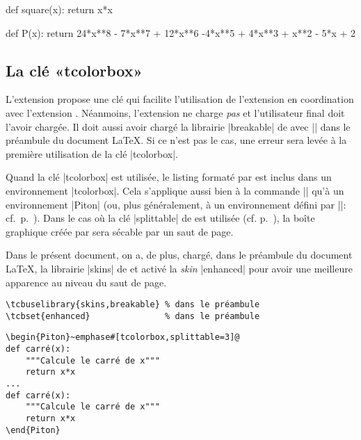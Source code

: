 \documentclass[dvipsnames,svgnames]{article}
\begin{document}
\begin{center}
\begin{Piton}
def square(x):
    return x*x
\end{Piton}
\hspace{1cm}
\begin{Piton}
def P(x):
    return 24*x**8 - 7*x**7 + 12*x**6 -4*x**5 + 4*x**3 + x**2 - 5*x + 2
\end{Piton}
\end{center}


\subsection{La clé «tcolorbox»}

\label{tcolorbox}

L'extension  propose une clé  qui facilite
l'utilisation de l'extension  en coordination avec l'extension
. Néanmoins, l'extension  ne charge \emph{pas} 
et l'utilisateur final doit l'avoir chargée. Il doit aussi avoir chargé la
librairie |breakable| de  avec || dans le
préambule du document LaTeX. Si ce n'est pas le cas, une erreur sera levée à la première
utilisation de la clé |tcolorbox|.


\bigskip
Quand la clé |tcolorbox| est utilisée, le listing formaté par  est
inclus dans un environnement |{tcolorbox}|. Cela s'applique aussi bien à la
commande |\PitonInputFile| qu'à un environnement |{Piton}| (ou, plus
généralement, à un environnement défini par |\NewPitonEnvironment|:
cf.~p.~\pageref{NewPitonEnvironment}). Dans le cas où la clé |splittable| de
 est utilisée (cf. p.~\pageref{coupure-de-pages}), la boîte graphique
créée par  sera sécable par un saut de page.

\bigskip
Dans le présent document, on a, de plus, chargé, dans le préambule du document LaTeX,
la librairie |skins| de  et activé la \emph{skin} |enhanced| pour avoir
une meilleure apparence au niveau du saut de page.

\begin{Verbatim}[formatcom=\footnotesize\color{gray}]
\tcbuselibrary{skins,breakable} % dans le préambule
\tcbset{enhanced}               % dans le préambule
\end{Verbatim}

\smallskip
\begin{Verbatim}
\begin{Piton}~emphase#[tcolorbox,splittable=3]@
def carré(x):
    """Calcule le carré de x"""
    return x*x
...
def carré(x):
    """Calcule le carré de x"""
    return x*x
\end{Piton}
\end{Verbatim}
\end{document}
